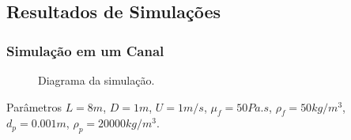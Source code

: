 \documentclass{beamer}
\begin{document}
\subsection{Resultados de Simulações}
\begin{frame}
  \frametitle{Simulação em um Canal}
  
  \begin{figure}
     {\raggedleft \tiny Diagrama da simulação.}
  \end{figure}
  \begin{block}{Parâmetros}
    $L=8m$, $D=1m$, $U=1m/s$, $\mu_f=50Pa.s$, $\rho_f=50kg/m^3$, $d_p=0.001m$, $\rho_p=20000kg/m^3$.
  \end{block}
\end{frame}
\end{document}
